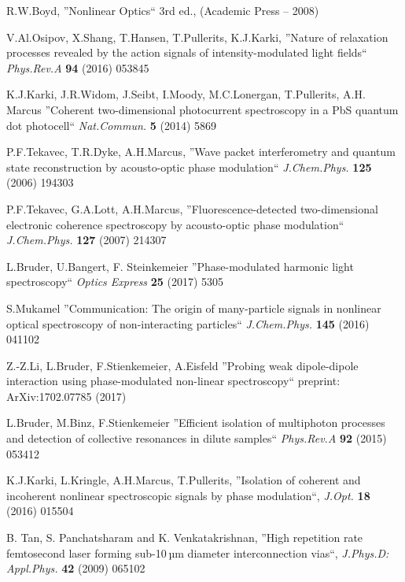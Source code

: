 \documentclass[prb,twocolumn,showpacs,epsfig,epsf]{revtex4}
\newcommand{\1}{\mathds{1}}
\begin{document}
\begin{thebibliography}{99}

 R.W.Boyd, ''Nonlinear Optics`` 3rd ed.,
(Academic Press -- 2008)

 V.Al.Osipov, X.Shang, T.Hansen, T.Pullerits, K.J.Karki, ''Nature of relaxation processes revealed by the action signals of intensity-modulated light fields`` {\it Phys.Rev.A} {\bf 94} (2016) 053845

 K.J.Karki, J.R.Widom, J.Seibt, I.Moody, M.C.Lonergan, T.Pullerits, A.H. Marcus ''Coherent two-dimensional photocurrent spectroscopy in a PbS quantum dot photocell`` {\it Nat.Commun.} {\bf 5} (2014) 5869

 P.F.Tekavec, T.R.Dyke, A.H.Marcus, ''Wave packet interferometry and quantum state reconstruction by acousto-optic phase modulation`` {\it J.Chem.Phys.} {\bf 125} (2006) 194303

 P.F.Tekavec, G.A.Lott, A.H.Marcus, ''Fluorescence-detected two-dimensional electronic coherence spectroscopy by acousto-optic phase modulation`` {\it J.Chem.Phys.} {\bf 127} (2007) 214307

 L.Bruder, U.Bangert, F. Steinkemeier ''Phase-modulated harmonic light spectroscopy`` {\it  Optics Express} {\bf 25} (2017) 5305

 S.Mukamel ''Communication: The origin of many-particle signals in nonlinear optical spectroscopy of non-interacting particles`` {\it J.Chem.Phys.} {\bf 145} (2016) 041102

 Z.-Z.Li, L.Bruder, F.Stienkemeier, A.Eisfeld ''Probing weak dipole-dipole interaction using phase-modulated non-linear spectroscopy`` preprint: ArXiv:1702.07785  (2017)

 L.Bruder, M.Binz, F.Stienkemeier ''Efficient isolation of multiphoton processes and detection of collective resonances in dilute samples`` {\it Phys.Rev.A} {\bf 92} (2015) 053412

 K.J.Karki, L.Kringle, A.H.Marcus, T.Pullerits, ''Isolation of coherent and incoherent nonlinear spectroscopic signals by phase modulation``, {\it J.Opt.} {\bf 18} (2016) 015504

 B. Tan, S. Panchatsharam and K. Venkatakrishnan, ''High repetition rate femtosecond laser forming sub-10 µm diameter interconnection vias``, {\it J.Phys.D: Appl.Phys.} {\bf 42} (2009) 065102


\end{thebibliography}
\end{document}

